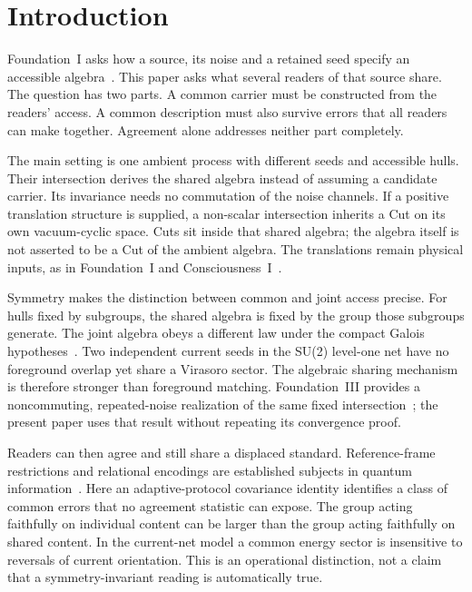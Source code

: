 \documentclass[12pt]{article}
\theoremstyle{definition}
\theoremstyle{remark}
\begin{document}
\clearpage
\tableofcontents
\clearpage

\section{Introduction}\label{sec:intro}

Foundation~I asks how a source, its noise and a retained seed specify an
accessible algebra~\cite{FoundationI}. This paper asks what several readers
of that source share. The question has two parts. A common carrier must be
constructed from the readers' access. A common description must also survive
errors that all readers can make together. Agreement alone addresses neither
part completely.

The main setting is one ambient process with different seeds and accessible
hulls. Their intersection derives the shared algebra instead of assuming a
candidate carrier. Its invariance needs no commutation of the noise channels.
If a positive translation structure is supplied, a non-scalar intersection
inherits a Cut on its own vacuum-cyclic space. Cuts sit inside that shared
algebra; the algebra itself is not asserted to be a Cut of the ambient algebra.
The translations remain physical inputs, as in Foundation~I and
Consciousness~I~\cite{FoundationI,PaperI}.

Symmetry makes the distinction between common and joint access precise.
For hulls fixed by subgroups, the shared algebra is fixed by the group those
subgroups generate. The joint algebra obeys a different law under the compact
Galois hypotheses~\cite{ILP1998}. Two independent current seeds in the SU(2)
level-one net have no foreground overlap yet share a Virasoro sector. The
algebraic sharing mechanism is therefore stronger than foreground matching.
Foundation~III provides a noncommuting, repeated-noise realization of the same
fixed intersection~\cite{FoundationIII}; the present paper uses that result
without repeating its convergence proof.

Readers can then agree and still share a displaced standard. Reference-frame
restrictions and relational encodings are established subjects in quantum
information~\cite{BRS2007}. Here an adaptive-protocol covariance identity
identifies a class of common errors that no agreement statistic can expose.
The group acting faithfully on individual content can be larger than the group
acting faithfully on shared content. In the current-net model a common energy
sector is insensitive to reversals of current orientation. This is an
operational distinction, not a claim that a symmetry-invariant reading is
automatically true.
\end{document}
